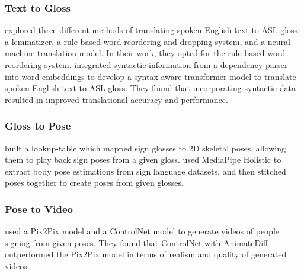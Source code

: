 \documentclass[../paper.tex]{subfiles}
\begin{document}
\subsubsection*{Text to Gloss}
\citet{Text2Gloss2Pose2Video} explored three different methods of translating spoken English text to ASL gloss: a lemmatizer, a rule-based word reordering and dropping system, and a neural machine translation model. In their work, they opted for the rule-based word reordering system. \citet{TransformerText2Gloss} integrated syntactic information from a dependency parser into word embeddings to develop a syntax-aware transformer model to translate spoken English text to ASL gloss. They found that incorporating syntactic data resulted in improved translational accuracy and performance.

\subsubsection*{Gloss to Pose}
\citet{Gloss2Pose} built a lookup-table which mapped sign glosses to 2D skeletal poses, allowing them to play back sign poses from a given gloss. \citet{Text2Gloss2Pose2Video} used MediaPipe Holistic to extract body pose estimations from sign language datasets, and then stitched poses together to create poses from given glosses.

\subsubsection*{Pose to Video}
\citet{Text2Gloss2Pose2Video} used a Pix2Pix model and a ControlNet model to generate videos of people signing from given poses. They found that ControlNet with AnimateDiff outperformed the Pix2Pix model in terms of realism and quality of generated videos.
\end{document}
